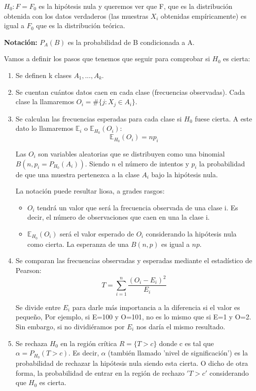 \documentclass[nochap]{apuntes}
\begin{document}
$H_0: F=F_0$ es la hipótesis nula y queremos ver que F, que es la distribución obtenida con los datos verdaderos (las muestras $X_i$ obtenidas empíricamente) es igual a $F_0$ que es la distribución teórica.

\textbf{Notación: }$P_A(B)$ es la probabilidad de B condicionada a A.

Vamos a definir los pasos que tenemos que seguir para comprobar si $H_0$ es cierta:
\begin{enumerate}
\item Se definen k clases $A_1,...,A_k$. 

\item Se cuentan cuántos datos caen en cada clase (frecuencias observadas). Cada clase la llamaremos $O_i=\#\{j:X_j\in A_i\}$.

\item Se calculan las frecuencias esperadas para cada clase si $H_0$ fuese cierta. A este dato lo llamaremos $\mathbb{E}_i$ o $\mathbb{E}_{H_0}(O_i)$: 
\[
\mathbb{E}_{H_0}(O_i) = np_i
\]

\obs Las $O_i$ son variables aleatorias que se distribuyen como una binomial $B(n, p_i=P_{H_0}(A_i))$. Siendo $n$ el número de intentos y $p_i$ la probabilidad de que una muestra pertenezca a la clase $A_i$ bajo la hipótesis nula. 

La notación puede resultar liosa, a grades rasgos:
\begin{itemize}
\item $O_i$ tendrá un valor que será la frecuencia observada de una clase i. Es decir, el número de observaciones que caen en una la clase i.
\item $\mathbb{E}_{H_0}(O_i)$ será el valor esperado de $O_i$ considerando la hipótesis nula como cierta. La esperanza de una $B(n,p)$ es igual a $np$.
\end{itemize}

\item Se comparan las frecuencias observadas y esperadas mediante el estadístico de Pearson:
\[
T = \sum_{i=1}^n \frac{(O_i-E_i)^2}{E_i}
\]

Se divide entre $E_i$ para darle más importancia a la diferencia si el valor es pequeño, Por ejemplo, si E=100 y O=101, no es lo mismo que si E=1 y O=2. Sin embargo, si no dividiéramos por $E_i$ nos daría el mismo resultado.

\item Se rechaza $H_0$ en la región crítica $R=\{T > c\}$ donde c es tal que $\alpha=P_{H_0}(T>c)$. Es decir, $\alpha$ (también llamado 'nivel de significación') es la probabilidad de rechazar la hipótesis nula siendo esta cierta. O dicho de otra forma, la probabilidad de entrar en la región de rechazo $'T>c'$ considerando que $H_0$ es cierta.
\end{enumerate}
\end{document}
